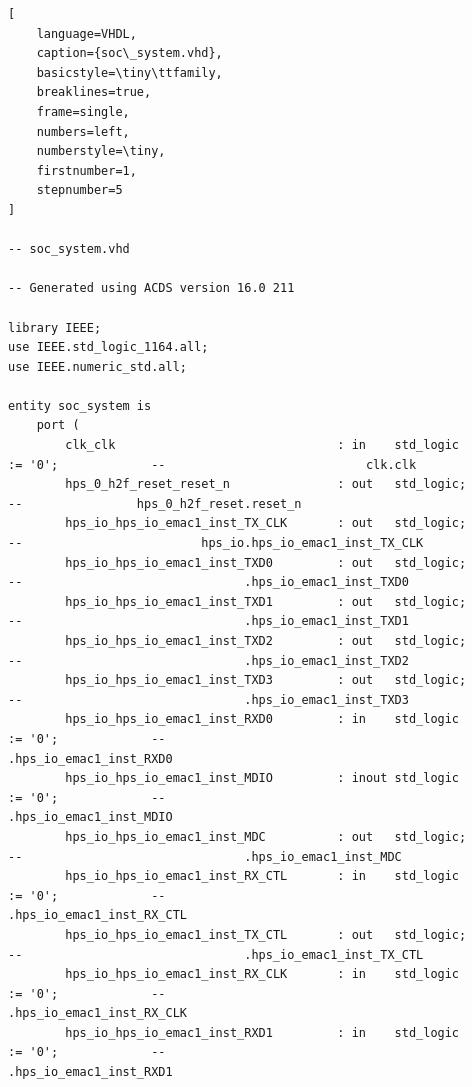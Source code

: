 \documentclass[conference]{IEEEtran}
\begin{document}
\begin{lstlisting}[
    language=VHDL, 
    caption={soc\_system.vhd}, 
    basicstyle=\tiny\ttfamily, 
    breaklines=true, 
    frame=single, 
    numbers=left, 
    numberstyle=\tiny, 
    firstnumber=1, 
    stepnumber=5
]

-- soc_system.vhd

-- Generated using ACDS version 16.0 211

library IEEE;
use IEEE.std_logic_1164.all;
use IEEE.numeric_std.all;

entity soc_system is
	port (
		clk_clk                               : in    std_logic                     := '0';             --                            clk.clk
		hps_0_h2f_reset_reset_n               : out   std_logic;                                        --                hps_0_h2f_reset.reset_n
		hps_io_hps_io_emac1_inst_TX_CLK       : out   std_logic;                                        --                         hps_io.hps_io_emac1_inst_TX_CLK
		hps_io_hps_io_emac1_inst_TXD0         : out   std_logic;                                        --                               .hps_io_emac1_inst_TXD0
		hps_io_hps_io_emac1_inst_TXD1         : out   std_logic;                                        --                               .hps_io_emac1_inst_TXD1
		hps_io_hps_io_emac1_inst_TXD2         : out   std_logic;                                        --                               .hps_io_emac1_inst_TXD2
		hps_io_hps_io_emac1_inst_TXD3         : out   std_logic;                                        --                               .hps_io_emac1_inst_TXD3
		hps_io_hps_io_emac1_inst_RXD0         : in    std_logic                     := '0';             --                               .hps_io_emac1_inst_RXD0
		hps_io_hps_io_emac1_inst_MDIO         : inout std_logic                     := '0';             --                               .hps_io_emac1_inst_MDIO
		hps_io_hps_io_emac1_inst_MDC          : out   std_logic;                                        --                               .hps_io_emac1_inst_MDC
		hps_io_hps_io_emac1_inst_RX_CTL       : in    std_logic                     := '0';             --                               .hps_io_emac1_inst_RX_CTL
		hps_io_hps_io_emac1_inst_TX_CTL       : out   std_logic;                                        --                               .hps_io_emac1_inst_TX_CTL
		hps_io_hps_io_emac1_inst_RX_CLK       : in    std_logic                     := '0';             --                               .hps_io_emac1_inst_RX_CLK
		hps_io_hps_io_emac1_inst_RXD1         : in    std_logic                     := '0';             --                               .hps_io_emac1_inst_RXD1

\end{lstlisting}
\end{document}
